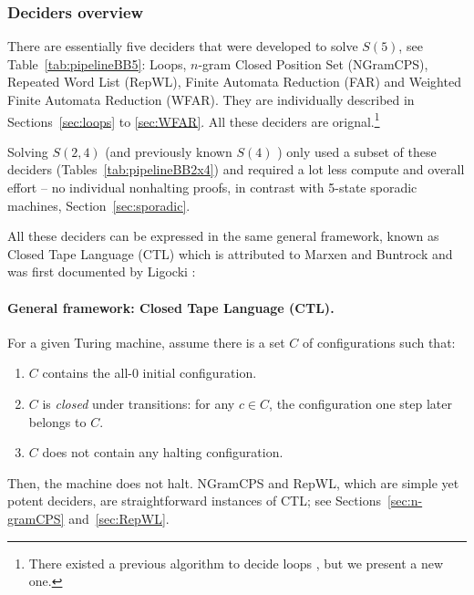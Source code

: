 \newpage

\subsubsection{Deciders overview}\label{sec:deciders-overview}

There are essentially five deciders that were developed to solve $S(5)$, see Table~\ref{tab:pipelineBB5}: Loops, $n$-gram Closed Position Set (NGramCPS), Repeated Word List (RepWL), Finite Automata Reduction (FAR) and Weighted Finite Automata Reduction (WFAR). They are individually described in Sections~\ref{sec:loops} to \ref{sec:WFAR}. All these deciders are orignal.\footnote{There existed a previous algorithm to decide loops \cite{Lin1963}, but we present a new one.}



Solving $S(2,4)$ (and previously known $S(4)$ \cite{Brady83}) only used  a subset of these deciders (Tables~\ref{tab:pipelineBB2x4}) and required a lot less compute and overall effort -- \eg no individual nonhalting proofs, in contrast with 5-state sporadic machines, Section~\ref{sec:sporadic}.

All these deciders can be expressed in the same general framework, known as Closed Tape Language (CTL) which is attributed to Marxen and Buntrock and was first documented by Ligocki \cite{ShawnCTL}:

\paragraph{General framework: Closed Tape Language (CTL).} For a given Turing machine, assume there is a set $C$ of configurations such that:
\begin{enumerate}
    \item $C$ contains the all-0 initial configuration.
    \item $C$ is \textit{closed} under transitions: for any $c \in C$, the configuration one step later belongs to $C$.
    \item $C$ does not contain any halting configuration.
\end{enumerate}


Then, the machine does not halt. NGramCPS and RepWL, which are simple yet potent deciders, are straightforward instances of CTL; see Sections~\ref{sec:n-gramCPS} and~\ref{sec:RepWL}.

